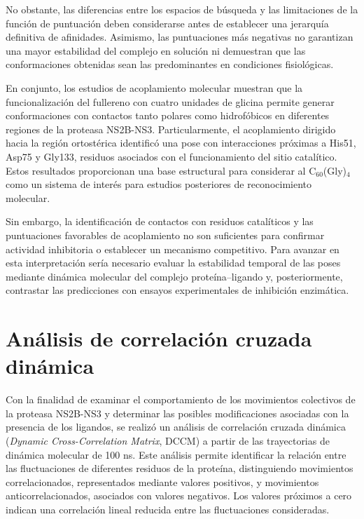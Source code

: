 No obstante, las diferencias entre los espacios de búsqueda y las limitaciones de la función de puntuación deben considerarse antes de establecer una jerarquía definitiva de afinidades. Asimismo, las puntuaciones más negativas no garantizan una mayor estabilidad del complejo en solución ni demuestran que las conformaciones obtenidas sean las predominantes en condiciones fisiológicas.

En conjunto, los estudios de acoplamiento molecular muestran que la funcionalización del fullereno con cuatro unidades de glicina permite generar conformaciones con contactos tanto polares como hidrofóbicos en diferentes regiones de la proteasa NS2B-NS3. Particularmente, el acoplamiento dirigido hacia la región ortostérica identificó una pose con interacciones próximas a His51, Asp75 y Gly133, residuos asociados con el funcionamiento del sitio catalítico. Estos resultados proporcionan una base estructural para considerar al C$_{60}$(Gly)$_4$ como un sistema de interés para estudios posteriores de reconocimiento molecular.

Sin embargo, la identificación de contactos con residuos catalíticos y las puntuaciones favorables de acoplamiento no son suficientes para confirmar actividad inhibitoria o establecer un mecanismo competitivo. Para avanzar en esta interpretación sería necesario evaluar la estabilidad temporal de las poses mediante dinámica molecular del complejo proteína--ligando y, posteriormente, contrastar las predicciones con ensayos experimentales de inhibición enzimática.


\section{Análisis de correlación cruzada dinámica}
\label{sec:dccm}

Con la finalidad de examinar el comportamiento de los movimientos colectivos de la proteasa NS2B-NS3 y determinar las posibles modificaciones asociadas con la presencia de los ligandos, se realizó un análisis de correlación cruzada dinámica (\textit{Dynamic Cross-Correlation Matrix}, DCCM) a partir de las trayectorias de dinámica molecular de 100 ns. Este análisis permite identificar la relación entre las fluctuaciones de diferentes residuos de la proteína, distinguiendo movimientos correlacionados, representados mediante valores positivos, y movimientos anticorrelacionados, asociados con valores negativos. Los valores próximos a cero indican una correlación lineal reducida entre las fluctuaciones consideradas.

